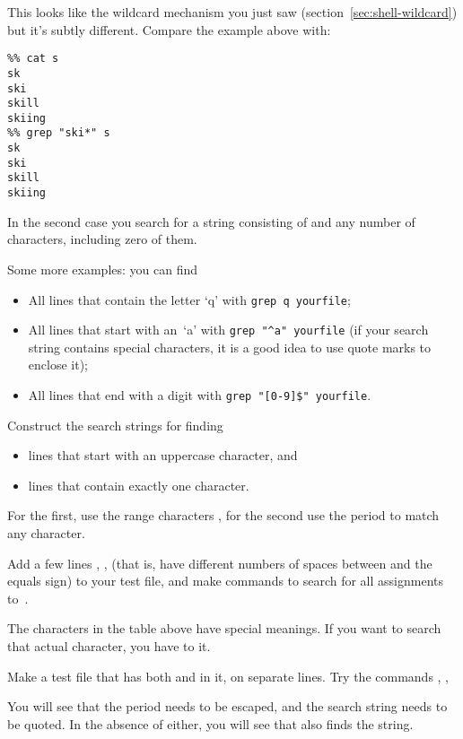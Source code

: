 This looks like the wildcard mechanism you just saw
(section~\ref{sec:shell-wildcard}) but it's subtly different. Compare
the example above with:
\begin{verbatim}
%% cat s
sk
ski
skill
skiing
%% grep "ski*" s
sk
ski
skill
skiing
\end{verbatim}
In the second case you search for a string consisting of  and
any number of  characters, including zero of them.

Some more examples: you can find
\begin{itemize}
\item All lines that contain the letter `q' with \verb+grep q yourfile+;
\item All lines that start with an~`a' with \verb+grep "^a" yourfile+
  (if your search string contains special characters, it is a good
  idea to use quote marks to enclose it);
\item All lines that end with a digit with \verb+grep "[0-9]$" yourfile+.
\end{itemize}

\begin{exercise}
  Construct the search strings for finding
    \begin{itemize}
    \item lines that start with an uppercase character, and
    \item lines that contain exactly one character.
    \end{itemize}
\end{exercise}
\begin{outcome}
  For the first, use the range characters \n{[]}, for the second use
  the period to match any character.
\end{outcome}

\begin{exercise}
  Add a few lines , ,  (that is,
  have different numbers of spaces between  and the equals sign)
  to your test file, and make  commands to search for all
  assignments to~.
\end{exercise}

The characters in the table above have special meanings. If you want
to search that actual character, you have to  it.

\begin{exercise}
  Make a test file that has both  and  in it, on
  separate lines.
  Try the commands , , 
\end{exercise}
\begin{outcome}
  You will see that the period needs to be escaped, and the search
    string needs to be quoted. In the absence of either, you will see
    that  also finds the  string.
\end{outcome}


